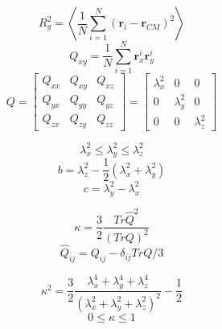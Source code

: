 \documentclass{article}
\begin{document}
\begin{equation}
	R_g^2 = \left< \frac{1}{N} \sum^{N}_{i=1} (\mathbf{r}_{i} - \mathbf{r}_{CM})^2 \right>
\end{equation}
\begin{equation}
	Q_{xy} = \frac{1}{N} \sum^{N}_{i=1} \mathbf{r}_x^i \mathbf{r}_y^i
\end{equation}
\begin{equation}
	Q = \left[  
		\begin{array}{ccc}
			Q_{xx} & Q_{xy} & Q_{xz} \\
			Q_{yx} & Q_{yy} & Q_{yz} \\
			Q_{zx} & Q_{zy} & Q_{zz}
		\end{array} 
	\right] 
	= \left[  
		\begin{array}{ccc}
			\lambda_{x}^2 & 0 & 0 \\
			0 & \lambda_{y}^2 & 0 \\
			0 & 0 & \lambda_{z}^2
		\end{array} 
	\right]
\end{equation}

\begin{equation}
	\lambda_{x}^2 \leq \lambda_{y}^2 \leq \lambda_{z}^2
\end{equation}
\begin{equation}
	b = \lambda_{z}^2 - \frac{1}{2}(\lambda_{x}^2 + \lambda_{y}^2)
\end{equation}
\begin{equation}
	c = \lambda_{y}^2 - \lambda_{x}^2
\end{equation}


\begin{equation}
	\kappa = \frac{3}{2}\frac{Tr\hat{Q}^2}{(TrQ)^2}
\end{equation}
\begin{equation}
	\hat{Q}_{ij} = Q_{ij} - \delta_{ij} TrQ/3
\end{equation}

\begin{equation}
	\kappa^2 = \frac{3}{2} \frac{\lambda_x^4 + \lambda_y^4 + \lambda_z^4}{(\lambda_x^2 + \lambda_y^2 + \lambda_z^2)^2} - \frac{1}{2}
\end{equation}
\begin{equation}
	0 \leq \kappa \leq 1
\end{equation}
\end{document}
